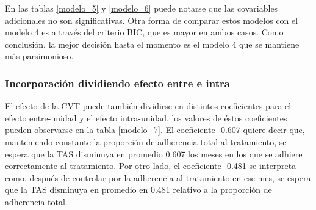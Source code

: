 \documentclass[spanish]{article}
\numberwithin{figure}{subsection}
\numberwithin{equation}{subsection}
\numberwithin{table}{subsection}
\begin{document}
En las tablas \ref{modelo_5} y \ref{modelo_6} puede notarse que las covariables
adicionales no son significativas. Otra forma de comparar estos modelos con el
modelo 4 es a través del criterio BIC, que es mayor en ambos casos. Como
conclusión, la mejor decisión hasta el momento es el modelo 4 que se mantiene
más parsimonioso.

\subsubsection{Incorporación dividiendo efecto entre e intra}

El efecto de la CVT puede también dividirse en distintos coeficientes para el
efecto entre-unidad y el efecto intra-unidad, los valores de éstos
coeficientes pueden observarse en la tabla \ref{modelo_7}. El coeficiente -0.607
quiere decir que, manteniendo constante la proporción de adherencia total al
tratamiento, se espera que la TAS disminuya en promedio 0.607 los meses en los
que se adhiere correctamente al tratamiento. Por otro lado, el coeficiente
-0.481 se interpreta como, después de controlar por la adherencia al tratamiento
en ese mes, se espera que la TAS disminuya en promedio en 0.481 relativo a la
proporción de adherencia total.



\end{document}
